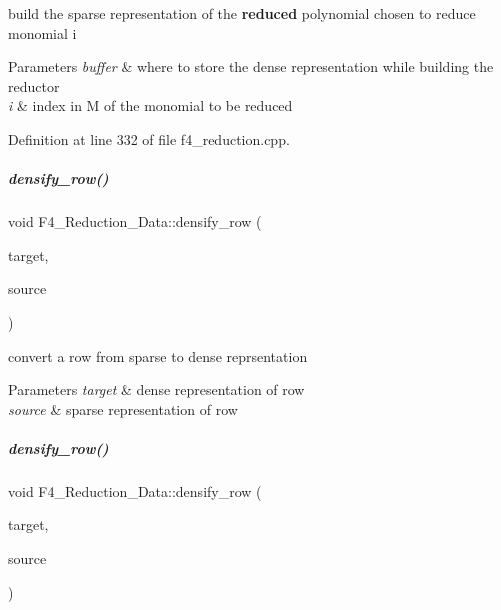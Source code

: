 build the sparse representation of the {\bfseries reduced} polynomial chosen to reduce monomial {\ttfamily i} 


\begin{DoxyParams}{Parameters}
{\em buffer} & where to store the dense representation while building the reductor \\
\hline
{\em i} & index in {\ttfamily M} of the monomial to be reduced \\
\hline
\end{DoxyParams}


Definition at line 332 of file f4\+\_\+reduction.\+cpp.

\mbox{\label{group___g_b_computation_a7c30bf1632513f7f951cffdae9810130}} 
\subparagraph{\texorpdfstring{densify\+\_\+row()}{densify\_row()}\hspace{0.1cm}{\footnotesize\ttfamily [1/2]}}
{\footnotesize\ttfamily void F4\+\_\+\+Reduction\+\_\+\+Data\+::densify\+\_\+row (\begin{DoxyParamCaption}\item[{vector$<$ C\+O\+E\+F\+\_\+\+T\+Y\+PE $>$ \&}]{target,  }\item[{const vector$<$ pair$<$ unsigned, C\+O\+E\+F\+\_\+\+T\+Y\+PE $>$ $>$ \&}]{source }\end{DoxyParamCaption})\hspace{0.3cm}{\ttfamily [protected]}}



convert a row from sparse to dense reprsentation 


\begin{DoxyParams}{Parameters}
{\em target} & dense representation of row \\
\hline
{\em source} & sparse representation of row \\
\hline
\end{DoxyParams}
\mbox{\label{group___g_b_computation_a7c30bf1632513f7f951cffdae9810130}} 
\subparagraph{\texorpdfstring{densify\+\_\+row()}{densify\_row()}\hspace{0.1cm}{\footnotesize\ttfamily [2/2]}}
{\footnotesize\ttfamily void F4\+\_\+\+Reduction\+\_\+\+Data\+::densify\+\_\+row (\begin{DoxyParamCaption}\item[{vector$<$ C\+O\+E\+F\+\_\+\+T\+Y\+PE $>$ \&}]{target,  }\item[{const vector$<$ pair$<$ unsigned, C\+O\+E\+F\+\_\+\+T\+Y\+PE $>$ $>$ \&}]{source }\end{DoxyParamCaption})\hspace{0.3cm}{\ttfamily [protected]}}



